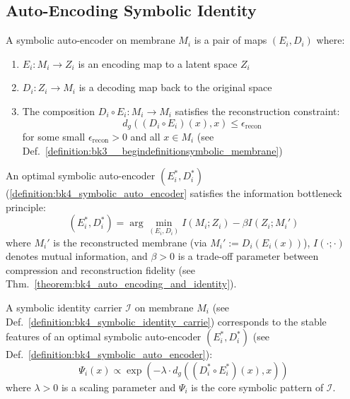 \subsection{Auto-Encoding Symbolic Identity}
\begin{definition} \label{definition:bk4_symbolic_auto_encoder}

A symbolic auto-encoder on membrane $M_i$ is a pair of maps $(E_i, D_i)$ where:
\begin{enumerate}
    \item $E_i: M_i \to Z_i$ is an encoding map to a latent space $Z_i$
    \item $D_i: Z_i \to M_i$ is a decoding map back to the original space
    \item The composition $D_i \circ E_i: M_i \to M_i$ satisfies the reconstruction constraint:
    \begin{equation}
        d_g((D_i \circ E_i)(x), x) \leq \epsilon_{\text{recon}}
    \end{equation}
    for some small $\epsilon_{\text{recon}} > 0$ and all $x \in M_i$ (see Def.~\ref{definition:bk3__begindefinitionsymbolic_membrane})
\end{enumerate}
\end{definition}
\begin{definition} \label{definition:bk4_information_bottleneck_p}

An optimal symbolic auto-encoder $(E_i^*, D_i^*)$ (\ref{definition:bk4_symbolic_auto_encoder} satisfies the information bottleneck principle:
\begin{equation}
    (E_i^*, D_i^*) = \arg\min_{(E_i, D_i)} I(M_i; Z_i) - \beta I(Z_i; M_i')
\end{equation}
where $M_i'$ is the reconstructed membrane (via $M_i' := D_i(E_i(x))$), $I(\cdot;\cdot)$ denotes mutual information, and $\beta > 0$ is a trade-off parameter between compression and reconstruction fidelity (see Thm.~\ref{theorem:bk4_auto_encoding_and_identity}).
\end{definition}
\begin{theorem} \label{theorem:bk4_auto_encoding_and_identity}

A symbolic identity carrier $\mathcal{I}$ on membrane $M_i$ (see Def.~\ref{definition:bk4_symbolic_identity_carrie}) corresponds to the stable features of an optimal symbolic auto-encoder $(E_i^*, D_i^*)$ (see Def.~\ref{definition:bk4_symbolic_auto_encoder}):
\begin{equation}
    \Psi_i(x) \propto \exp\left(-\lambda \cdot d_g((D_i^* \circ E_i^*)(x), x)\right)
\end{equation}
where $\lambda > 0$ is a scaling parameter and $\Psi_i$ is the core symbolic pattern of $\mathcal{I}$.
\end{theorem}
